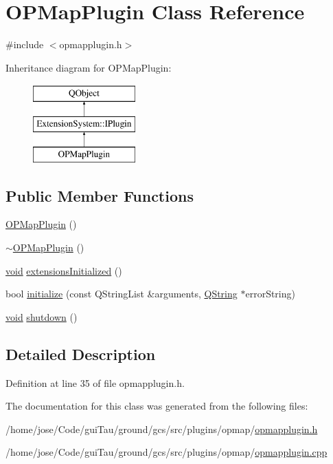 \hypertarget{class_o_p_map_plugin}{\section{O\-P\-Map\-Plugin Class Reference}
\label{class_o_p_map_plugin}
}


{\ttfamily \#include $<$opmapplugin.\-h$>$}

Inheritance diagram for O\-P\-Map\-Plugin\-:\begin{figure}[H]
\begin{center}
\leavevmode
\includegraphics[height=3.000000cm]{class_o_p_map_plugin}
\end{center}
\end{figure}
\subsection*{Public Member Functions}
\begin{DoxyCompactItemize}
\item 
\hyperlink{group___o_p_map_plugin_ga1c402cf38d48ab5c7dacf62490bb5bc2}{O\-P\-Map\-Plugin} ()
\item 
\hyperlink{group___o_p_map_plugin_gaa1ca844e6b44f8013f6ad72889055c41}{$\sim$\-O\-P\-Map\-Plugin} ()
\item 
\hyperlink{group___u_a_v_objects_plugin_ga444cf2ff3f0ecbe028adce838d373f5c}{void} \hyperlink{group___o_p_map_plugin_ga4698621f6178bff1aad1d856fbcc3e08}{extensions\-Initialized} ()
\item 
bool \hyperlink{group___o_p_map_plugin_gac6a236b2b4276677428bd2305710a2d7}{initialize} (const Q\-String\-List \&arguments, \hyperlink{group___u_a_v_objects_plugin_gab9d252f49c333c94a72f97ce3105a32d}{Q\-String} $\ast$error\-String)
\item 
\hyperlink{group___u_a_v_objects_plugin_ga444cf2ff3f0ecbe028adce838d373f5c}{void} \hyperlink{group___o_p_map_plugin_ga76c3d81f95369b3c96c26739bc07e506}{shutdown} ()
\end{DoxyCompactItemize}


\subsection{Detailed Description}


Definition at line 35 of file opmapplugin.\-h.



The documentation for this class was generated from the following files\-:\begin{DoxyCompactItemize}
\item 
/home/jose/\-Code/gui\-Tau/ground/gcs/src/plugins/opmap/\hyperlink{opmapplugin_8h}{opmapplugin.\-h}\item 
/home/jose/\-Code/gui\-Tau/ground/gcs/src/plugins/opmap/\hyperlink{opmapplugin_8cpp}{opmapplugin.\-cpp}\end{DoxyCompactItemize}
